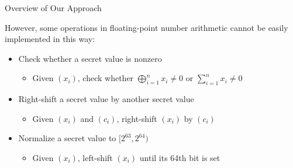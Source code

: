 \begin{frame}{Overview of Our Approach}

However, some operations in floating-point number arithmetic cannot be easily implemented in this way:
\pause
\begin{itemize}
	\item Check whether a secret value is nonzero
	\begin{itemize}
		\item Given $(x_i)$, check whether $\bigoplus_{i=1}^n x_i \neq 0$ or $\sum_{i=1}^n x_i \neq 0$
	\end{itemize}
	\pause
	\item Right-shift a secret value by another secret value
	\begin{itemize}
		\item Given $(x_i)$ and $(c_i)$, right-shift $(x_i)$ by $(c_i)$
	\end{itemize}
	\pause
	\item Normalize a secret value to $[2^{63},2^{64})$
	\begin{itemize}
		\item Given $(x_i)$, left-shift $(x_i)$ until its 64th bit is set
	\end{itemize}
\end{itemize}

\end{frame}


